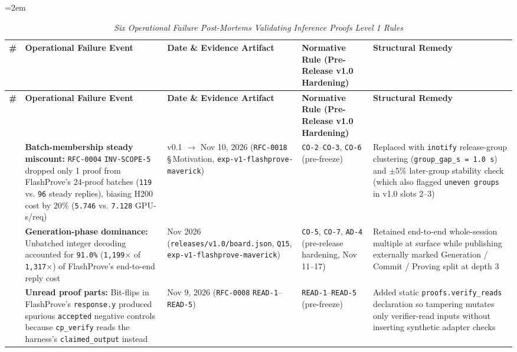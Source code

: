 \documentclass[11pt,letterpaper]{article}
\begin{document}
{\footnotesize\setlength{\tabcolsep}{4pt}\emergencystretch=2em
\begin{longtable}{@{}>{\raggedright\arraybackslash}p{} >{\raggedright\arraybackslash}p{} >{\raggedright\arraybackslash}p{} >{\raggedright\arraybackslash}p{} >{\raggedright\arraybackslash}p{}@{}}
\caption{\textit{Six Operational Failure Post-Mortems Validating Inference Proofs Level 1 Rules} \cite{iproofs2026,sash2026}} \\
\toprule
\textbf{\#} & \textbf{Operational Failure Event} & \textbf{Date \& Evidence Artifact} & \textbf{Normative Rule (Pre-Release v1.0 Hardening)} & \textbf{Structural Remedy} \\
\midrule
\endfirsthead
\toprule
\textbf{\#} & \textbf{Operational Failure Event} & \textbf{Date \& Evidence Artifact} & \textbf{Normative Rule (Pre-Release v1.0 Hardening)} & \textbf{Structural Remedy} \\
\midrule
\endhead
\bottomrule
\endfoot
1 & \textbf{Batch-membership steady miscount:} \texttt{RFC-0004} \texttt{INV-\allowbreak{}SCOPE-5} dropped only 1 proof from FlashProve's 24-proof batches (\texttt{119} vs. \texttt{96} steady replies), biasing H200 cost by 20\% (\texttt{5.746} vs. \texttt{7.128} GPU-s/req) & v0.1 $\rightarrow$ Nov 10, 2026 (\texttt{RFC-0018} \S\,Motivation, \texttt{exp-\allowbreak{}v1-\allowbreak{}flashprove-\allowbreak{}maverick}) & \texttt{CO-2}--\texttt{CO-3}, \texttt{CO-6} (pre-freeze) & Replaced with \texttt{inotify} release-group clustering (\texttt{group\_\allowbreak{}gap\_\allowbreak{}s = 1.0 s}) and $\pm 5\%$ later-group stability check (which also flagged \texttt{uneven groups} in v1.0 slots 2--3) \\
2 & \textbf{Generation-phase dominance:} Unbatched integer decoding accounted for \texttt{91.0\%} (\texttt{1,199$\times$} of \texttt{1,317$\times$}) of FlashProve's end-to-end reply cost & Nov 2026 (\texttt{releases/\allowbreak{}v1.0/\allowbreak{}board.\allowbreak{}json}, \texttt{Q15}, \texttt{exp-\allowbreak{}v1-\allowbreak{}flashprove-\allowbreak{}maverick}) & \texttt{CO-5}, \texttt{CO-7}, \texttt{AD-4} (pre-release hardening, Nov 11--17) & Retained end-to-end whole-session multiple at surface while publishing externally marked Generation / Commit / Proving split at depth 3 \\
3 & \textbf{Unread proof parts:} Bit-flips in FlashProve's \texttt{response.\allowbreak{}y} produced spurious \texttt{accepted} negative controls because \texttt{cp\_\allowbreak{}verify} reads the harness's \texttt{claimed\_\allowbreak{}output} instead & Nov 9, 2026 (\texttt{RFC-0008} \texttt{READ-1}--\texttt{READ-5}) & \texttt{READ-1}--\texttt{READ-5} (pre-freeze) & Added static \texttt{proofs.\allowbreak{}verify\_\allowbreak{}reads} declaration so tampering mutates only verifier-read inputs without inserting synthetic adapter checks \\

\end{longtable}}
\end{document}
